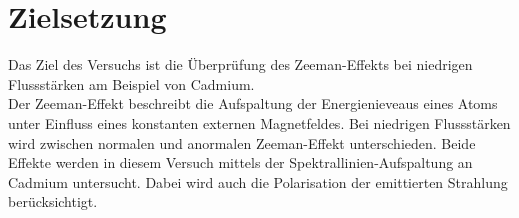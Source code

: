 \section{Zielsetzung}
\label{sec:ziel}
Das Ziel des Versuchs ist die Überprüfung des Zeeman-Effekts bei niedrigen Flussstärken am Beispiel von Cadmium.\\
Der Zeeman-Effekt beschreibt die Aufspaltung der Energienieveaus eines Atoms unter Einfluss eines konstanten externen Magnetfeldes.
Bei niedrigen Flussstärken wird zwischen normalen und anormalen Zeeman-Effekt unterschieden.
Beide Effekte werden in diesem Versuch mittels der Spektrallinien-Aufspaltung an Cadmium untersucht.
Dabei wird auch die Polarisation der emittierten Strahlung berücksichtigt.
